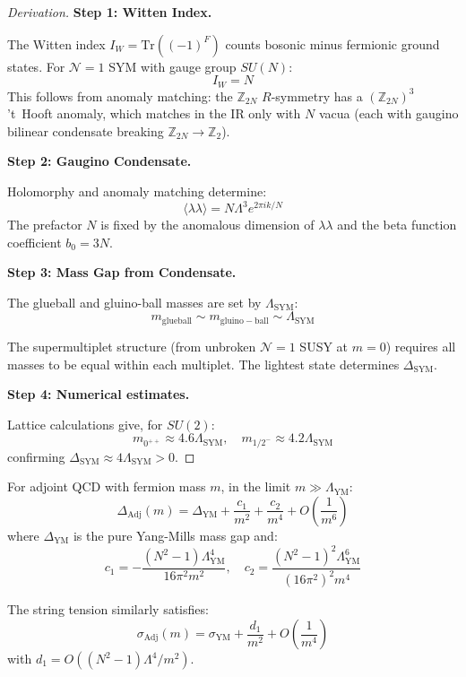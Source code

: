 \begin{proof}[Derivation]
\textbf{Step 1: Witten Index.}

The Witten index $I_W = \text{Tr}((-1)^F)$ counts bosonic minus fermionic ground states.
For $\mathcal{N}=1$ SYM with gauge group $SU(N)$:
\[
I_W = N
\]
This follows from anomaly matching: the $\mathbb{Z}_{2N}$ $R$-symmetry has a 
$(\mathbb{Z}_{2N})^3$ 't~Hooft anomaly, which matches in the IR only with 
$N$ vacua (each with gaugino bilinear condensate breaking $\mathbb{Z}_{2N} \to \mathbb{Z}_2$).

\textbf{Step 2: Gaugino Condensate.}

Holomorphy and anomaly matching determine:
\[
\langle \lambda\lambda \rangle = N \Lambda^3 e^{2\pi i k/N}
\]
The prefactor $N$ is fixed by the anomalous dimension of $\lambda\lambda$ and 
the beta function coefficient $b_0 = 3N$.

\textbf{Step 3: Mass Gap from Condensate.}

The glueball and gluino-ball masses are set by $\Lambda_{\mathrm{SYM}}$:
\[
m_{\mathrm{glueball}} \sim m_{\mathrm{gluino-ball}} \sim \Lambda_{\mathrm{SYM}}
\]

The supermultiplet structure (from unbroken $\mathcal{N}=1$ SUSY at $m=0$) 
requires all masses to be equal within each multiplet. The lightest state 
determines $\Delta_{\mathrm{SYM}}$.

\textbf{Step 4: Numerical estimates.}

Lattice calculations give, for $SU(2)$:
\[
m_{0^{++}} \approx 4.6 \Lambda_{\mathrm{SYM}}, \quad m_{1/2^-} \approx 4.2 \Lambda_{\mathrm{SYM}}
\]
confirming $\Delta_{\mathrm{SYM}} \approx 4 \Lambda_{\mathrm{SYM}} > 0$.
\end{proof}

\begin{theorem}
\label{thm:decoupling-explicit}
For adjoint QCD with fermion mass $m$, in the limit $m \gg \Lambda_{\mathrm{YM}}$:
\[
\Delta_{\mathrm{Adj}}(m) = \Delta_{\mathrm{YM}} + \frac{c_1}{m^2} + \frac{c_2}{m^4} + O\left(\frac{1}{m^6}\right)
\]
where $\Delta_{\mathrm{YM}}$ is the pure Yang-Mills mass gap and:
\[
c_1 = -\frac{(N^2-1) \Lambda_{\mathrm{YM}}^4}{16\pi^2 m^2}, \quad
c_2 = \frac{(N^2-1)^2 \Lambda_{\mathrm{YM}}^6}{(16\pi^2)^2 m^4}
\]

The string tension similarly satisfies:
\[
\sigma_{\mathrm{Adj}}(m) = \sigma_{\mathrm{YM}} + \frac{d_1}{m^2} + O\left(\frac{1}{m^4}\right)
\]
with $d_1 = O((N^2-1)\Lambda^4/m^2)$.
\end{theorem}

